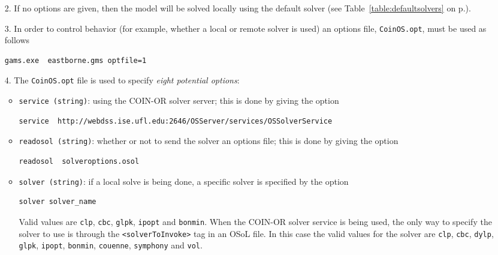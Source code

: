 \documentclass[11pt]{article}
\renewcommand{\_}{{\char"5F}}
\renewcommand{\{}{{\char"7B}}
\renewcommand{\}}{{\char"7D}}
\renewcommand{\^}{{\char"0D}}
\renewcommand{\'}{{\char"0D}}
\begin{document}
\begin{enumerate}[Step 1:]
\begin{enumerate}
\item[2.]   If no options are given, then the model will be solved locally using the default solver 
(see Table~\ref{table:defaultsolvers} on p.\pageref{table:defaultsolvers}).

\item[3.] In order to control behavior (for example, whether a local or remote solver is used)  an options
 file,  {\tt CoinOS.opt}, must be used as follows

\begin{verbatim}
gams.exe  eastborne.gms optfile=1
\end{verbatim}

\item[4.]  The  {\tt CoinOS.opt} file is used to specify {\it eight potential options}:


\begin{itemize}
\item {\tt service (string)}: using the COIN-OR solver server; this is done by giving the option

\begin{verbatim}
service  http://webdss.ise.ufl.edu:2646/OSServer/services/OSSolverService
\end{verbatim}


\item  {\tt readosol (string)}: whether or not to send the solver an options file; this is done by 
giving the option
\begin{verbatim}
readosol  solveroptions.osol
\end{verbatim}


\item   {\tt solver (string)}: if a local solve is being done,  a specific solver is specified by 
the option
\begin{verbatim}
solver solver_name
\end{verbatim}

Valid values are {\tt clp},  {\tt cbc}, {\tt glpk}, {\tt ipopt} and {\tt bonmin}. %
When the COIN-OR solver service is being used, the only way to specify the solver to use is through 
the {\tt <solverToInvoke>} tag in an OSoL file. In this case the valid values for the solver are  
{\tt clp}, {\tt cbc}, {\tt dylp}, {\tt glpk}, {\tt ipopt}, {\tt bonmin}, {\tt couenne}, {\tt symphony}
and {\tt vol}.




\end{itemize}
\end{enumerate}
\end{enumerate}
\end{document}
